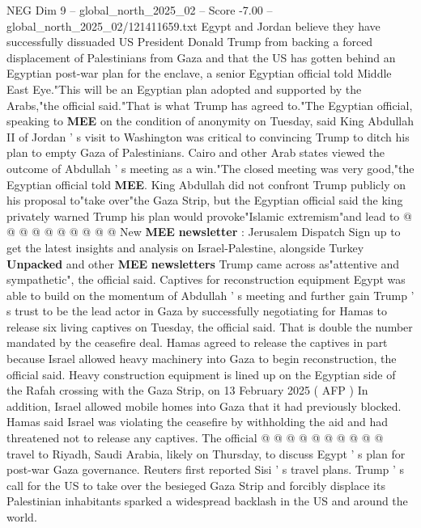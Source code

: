 \begin{textsample}{NEG Dim 9 – global\_north\_2025\_02 – Score -7.00 – global\_north\_2025\_02/121411659.txt}  \label{ex:f9_neg_007}
Egypt and Jordan believe they have successfully dissuaded US President Donald Trump from backing a forced displacement of Palestinians from Gaza and that the US has gotten behind an Egyptian post-war plan for the enclave, a senior Egyptian official told Middle East Eye."This will be an Egyptian plan adopted and supported by the Arabs,"the official said."That is what Trump has agreed to."The Egyptian official, speaking to \textbf{MEE} on the condition of anonymity on Tuesday, said King Abdullah II of Jordan ' s visit to Washington was critical to convincing Trump to ditch his plan to empty Gaza of Palestinians.
Cairo and other Arab states viewed the outcome of Abdullah ' s meeting as a win."The closed meeting was very good,"the Egyptian official told \textbf{MEE}.
King Abdullah did not confront Trump publicly on his proposal to"take over"the Gaza Strip, but the Egyptian official said the king privately warned Trump his plan would provoke"Islamic extremism"and lead to @ @ @ @ @ @ @ @ @ @ New \textbf{MEE} \textbf{newsletter} : Jerusalem Dispatch Sign up to get the latest insights and analysis on Israel-Palestine, alongside Turkey \textbf{Unpacked} and other \textbf{MEE} \textbf{newsletters} Trump came across as"attentive and sympathetic", the official said.
Captives for reconstruction equipment Egypt was able to build on the momentum of Abdullah ' s meeting and further gain Trump ' s trust to be the lead actor in Gaza by successfully negotiating for Hamas to release six living captives on Tuesday, the official said.
That is double the number mandated by the ceasefire deal.
Hamas agreed to release the captives in part because Israel allowed heavy machinery into Gaza to begin reconstruction, the official said.
Heavy construction equipment is lined up on the Egyptian side of the Rafah crossing with the Gaza Strip, on 13 February 2025 ( AFP ) In addition, Israel allowed mobile homes into Gaza that it had previously blocked.
Hamas said Israel was violating the ceasefire by withholding the aid and had threatened not to release any captives.
The official @ @ @ @ @ @ @ @ @ @ travel to Riyadh, Saudi Arabia, likely on Thursday, to discuss Egypt ' s plan for post-war Gaza governance.
Reuters first reported Sisi ' s travel plans.
Trump ' s call for the US to take over the besieged Gaza Strip and forcibly displace its Palestinian inhabitants sparked a widespread backlash in the US and around the world.

\end{textsample}

